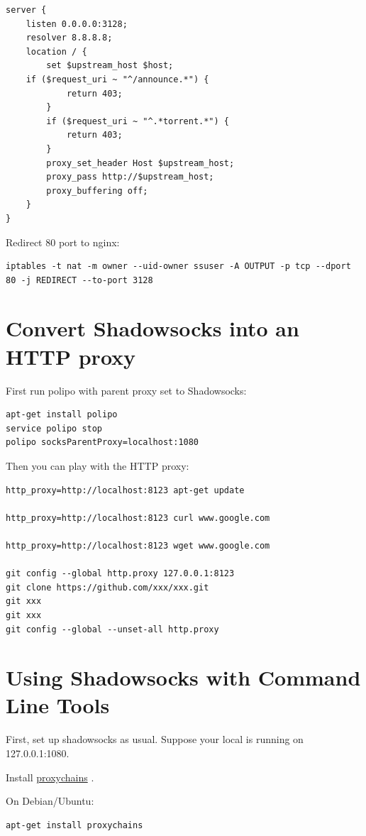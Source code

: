 \documentclass[11pt,a4paper]{sphinxmanual}
\begin{document}
\begin{Verbatim}
server {
    listen 0.0.0.0:3128;
    resolver 8.8.8.8;
    location / {
        set $upstream_host $host;
    if ($request_uri ~ "^/announce.*") {
            return 403;
        }
        if ($request_uri ~ "^.*torrent.*") {
            return 403;
        }
        proxy_set_header Host $upstream_host;
        proxy_pass http://$upstream_host;
        proxy_buffering off;
    }
}
\end{Verbatim}

Redirect 80 port to nginx:
\begin{Verbatim}
iptables -t nat -m owner --uid-owner ssuser -A OUTPUT -p tcp --dport 80 -j REDIRECT --to-port 3128
\end{Verbatim}


\section{Convert Shadowsocks into an HTTP proxy}
\label{sec-6-3}
First run polipo with parent proxy set to Shadowsocks:

\begin{Verbatim}
apt-get install polipo
service polipo stop
polipo socksParentProxy=localhost:1080
\end{Verbatim}

Then you can play with the HTTP proxy:
\begin{Verbatim}
http_proxy=http://localhost:8123 apt-get update

http_proxy=http://localhost:8123 curl www.google.com

http_proxy=http://localhost:8123 wget www.google.com

git config --global http.proxy 127.0.0.1:8123
git clone https://github.com/xxx/xxx.git
git xxx
git xxx
git config --global --unset-all http.proxy
\end{Verbatim}


\section{Using Shadowsocks with Command Line Tools}
\label{sec-6-4}
First, set up shadowsocks as usual. Suppose your local is running on 127.0.0.1:1080.

Install \href{http://proxychains.sourceforge.net/}{proxychains} .

On Debian/Ubuntu:
\begin{Verbatim}
apt-get install proxychains
\end{Verbatim}
\end{document}
